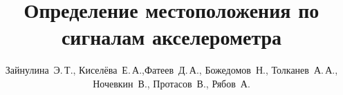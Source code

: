 \documentclass[12pt,twoside]{article}
\title
    [Определение местоположения по сигналам акселерометра] 
    {Определение местоположения по сигналам акселерометра}
\author
    [Зайнулина~Э.\,Т.] %
    {Зайнулина~Э.\,Т., Киселёва~Е.\,А.,Фатеев~Д.\,А.,
    Божедомов~Н., Толканев~А.\,А., Ночевкин~В.,
    Протасов~В., Рябов~А.} %
\begin{document}
\maketitle
\bigskip
\bigskip
\bigskip
\bigskip
\maketitleSecondary
\end{document}
